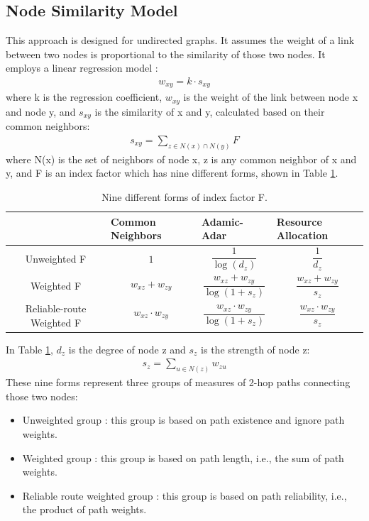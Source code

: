 \documentclass[12pt]{WSUThesis}
\theoremstyle{definition}
\begin{document}
\subsection{Node Similarity Model}
This approach is designed for undirected graphs.
It assumes the weight of a link between two nodes 
is proportional to the similarity of those two nodes.
It employs a linear regression model \cite{zhao2015prediction}:
\begin{align*}
w_{xy} = k \cdot s_{xy}
\end{align*}
where k is the regression coefficient,
$ w_{xy} $ is the weight of the link between node x and node y,
and $ s_{xy} $ is the similarity of x and y, calculated based on their common neighbors:
\begin{align*}
s_{xy} = \sum_{z \in N(x) \cap N(y)} F
\end{align*}
where N(x) is the set of neighbors of node x, z is any common neighbor of x and y,
and F is an index factor which has nine different forms, shown in Table \ref{tab:indexes}.
\begin{table}[!ht]\centering
	\caption{Nine different forms of index factor F.}
	\begin{tabularx}{\textwidth}{>{\columncolor{blue!30}}cXXX}  \hline \rowcolor{blue!30}
		& Common Neighbors & Adamic-Adar & Resource Allocation \\ \hline
		Unweighted F &
		\[1\] &
		\[\frac{1}{\log(d_z)}\] &
		\[\frac{1}{d_z}\] \\ \hline
		Weighted F &
		\[w_{xz} + w_{zy}\] &
		\[\frac{w_{xz} + w_{zy}}{\log(1 + s_z)}\] &
		\[\frac{w_{xz} + w_{zy}}{s_z}\] \\ \hline
		Reliable-route Weighted F &
		\[ w_{xz} \cdot w_{zy}\] &
		\[\frac{w_{xz} \cdot w_{zy}}{\log(1 + s_z)}\] &
		\[\frac{w_{xz} \cdot w_{zy}}{s_z}\] \\ \hline
	\end{tabularx}
	\label{tab:indexes}
\end{table}
In Table \ref{tab:indexes}, $ d_z $ is the degree of node z and $ s_z $ is the strength of node z:
\begin{align*}
s_z = \sum_{u \in N(z)} w_{zu}
\end{align*}
These nine forms represent three groups of measures of 2-hop paths connecting those two nodes:
\begin{itemize}
	\item Unweighted group \cite{adamic2003friends}:
	this group is based on path existence and ignore path weights.
	\item Weighted group \cite{murata2007link}:
	this group is based on path length, i.e., the sum of path weights.
	\item Reliable route weighted group \cite{taha1982operations}:
	this group is based on path reliability, i.e., the product of path weights.
\end{itemize}
\end{document}
